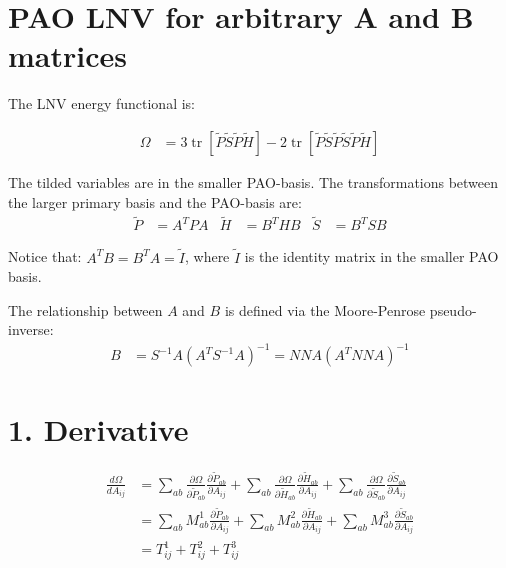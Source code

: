 \documentclass{article}
\newcommand{\tr}{\operatorname{tr}}
\begin{document}
\section*{PAO LNV for arbitrary A and B matrices}

The LNV energy functional is:

\begin{align*}
    \Omega & = 3\tr[\tilde P \tilde S \tilde P \tilde H ] - 2\tr[\tilde P \tilde S \tilde P \tilde S \tilde P \tilde H]
\end{align*}

The tilded variables are in the smaller PAO-basis. The transformations between the larger primary basis and the PAO-basis are:
\begin{align*}
    \tilde P &= A^T  P A &
    \tilde H &= B^T  H B &
    \tilde S &= B^T  S B
\end{align*}

Notice that: $ A^T B = B^T A = \tilde I $, where $\tilde I$ is the identity matrix in the smaller PAO basis.

The relationship between $A$ and $B$ is defined via the Moore-Penrose pseudo-inverse:
\begin{align*}
    B & = S^{-1} A (A^T S^{-1} A) ^{-1} = NN A (A^T NN A) ^{-1}
\end{align*}


\newpage
\section*{1. Derivative}

\begin{align*}
    \frac{d \Omega}{d A_{ij}}
 &= \sum_{ab} \frac{\partial \Omega}{\partial \tilde P_{ab}}  \frac{\partial \tilde P_{ab}}{\partial A_{ij}}
  + \sum_{ab} \frac{\partial \Omega}{\partial \tilde H_{ab}}  \frac{\partial \tilde H_{ab}}{\partial A_{ij}}
  + \sum_{ab} \frac{\partial \Omega}{\partial \tilde S_{ab}}  \frac{\partial \tilde S_{ab}}{\partial A_{ij}}\\
 &= \sum_{ab} M^1_{ab} \frac{\partial \tilde P_{ab}}{\partial A_{ij}}
  + \sum_{ab} M^2_{ab} \frac{\partial \tilde H_{ab}}{\partial A_{ij}}
  + \sum_{ab} M^3_{ab} \frac{\partial \tilde S_{ab}}{\partial A_{ij}}\\
 &= T^1_{ij} + T^2_{ij} + T^3_{ij}
\end{align*}
\end{document}
